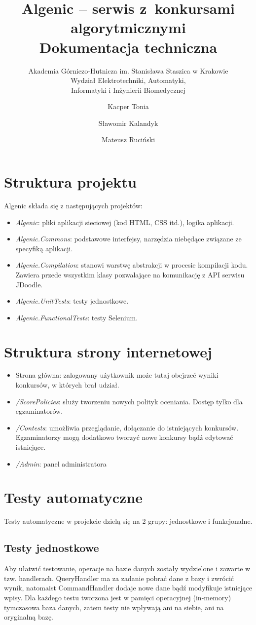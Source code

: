 \documentclass{article}
\title{Algenic -- serwis z~konkursami algorytmicznymi\\
    Dokumentacja techniczna}
\subtitle{Akademia Górniczo-Hutnicza im. Stanisława Staszica w Krakowie\\
	Wydział Elektrotechniki, Automatyki,\\
	Informatyki i Inżynierii Biomedycznej}
\author{Kacper Tonia\and
		Sławomir Kalandyk\and
		Mateusz Ruciński}
\date{}
\begin{document}
\maketitle

\section{Struktura projektu}
Algenic składa się z następujących projektów:
\begin{itemize}
    \item \textit{Algenic}: pliki aplikacji sieciowej (kod HTML, CSS itd.), logika aplikacji.
    \item \textit{Algenic.Commons}: podstawowe interfejsy, narzędzia niebędące związane ze specyfiką aplikacji.
    \item \textit{Algenic.Compilation}: stanowi warstwę abstrakcji w procesie kompilacji kodu. Zawiera przede wszystkim klasy pozwalające na komunikację z API serwisu JDoodle.
    \item \textit{Algenic.UnitTests}: testy jednostkowe.
    \item \textit{Algenic.FunctionalTests}: testy Selenium.
\end{itemize}

\section{Struktura strony internetowej}
\begin{itemize}
    \item Strona główna: zalogowany użytkownik może tutaj obejrzeć wyniki konkursów, w których brał udział.
    \item \emph{/ScorePolicies}: służy tworzeniu nowych polityk oceniania. Dostęp tylko dla egzaminatorów.
    \item \emph{/Contests}: umożliwia przeglądanie, dołączanie do istniejących konkursów. Egzaminatorzy mogą dodatkowo tworzyć nowe konkursy bądź edytować istniejące.
    \item \emph{/Admin}: panel administratora
\end{itemize}

\section{Testy automatyczne}
Testy automatyczne w projekcie dzielą się na 2 grupy: jednostkowe i funkcjonalne.
\subsection{Testy jednostkowe}
Aby ułatwić testowanie, operacje na bazie danych zostały wydzielone i zawarte w tzw. handlerach. QueryHandler ma za zadanie pobrać dane z bazy i zwrócić wynik, natomaist CommandHandler dodaje nowe dane bądź modyfikuje istniejące wpisy. Dla każdego testu tworzona jest w pamięci operacyjnej (in-memory) tymczasowa baza danych, zatem testy nie wpływają ani na siebie, ani na oryginalną bazę.
\end{document}

